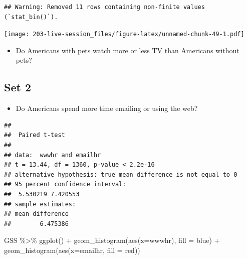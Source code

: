 \documentclass[
]{book}
\newenvironment{Shaded}{\begin{snugshade}}{\end{snugshade}}
\newcommand{\AttributeTok}[1]{\textcolor[rgb]{0.77,0.63,0.00}{#1}}
\newcommand{\ConstantTok}[1]{\textcolor[rgb]{0.00,0.00,0.00}{#1}}
\newcommand{\FunctionTok}[1]{\textcolor[rgb]{0.00,0.00,0.00}{#1}}
\newcommand{\NormalTok}[1]{#1}
\newcommand{\SpecialCharTok}[1]{\textcolor[rgb]{0.00,0.00,0.00}{#1}}
\newcommand{\StringTok}[1]{\textcolor[rgb]{0.31,0.60,0.02}{#1}}
\providecommand{\tightlist}{%
  \setlength{\itemsep}{0pt}\setlength{\parskip}{0pt}}
\theoremstyle{definition}
\theoremstyle{definition}
\theoremstyle{definition}
\theoremstyle{definition}
\theoremstyle{remark}
\begin{document}
\begin{verbatim}
## Warning: Removed 11 rows containing non-finite values (`stat_bin()`).
\end{verbatim}

\texttt{[image: 203-live-session\_files/figure-latex/unnamed-chunk-49-1.pdf]}

\begin{itemize}
\tightlist
\item
  Do Americans with pets watch more or less TV than Americans without pets?
\end{itemize}

\hypertarget{set-2}{%
\subsection{Set 2}\label{set-2}}

\begin{itemize}
\tightlist
\item
  Do Americans spend more time emailing or using the web?
\end{itemize}

\begin{Shaded}
\end{Shaded}

\begin{verbatim}
## 
##  Paired t-test
## 
## data:  wwwhr and emailhr
## t = 13.44, df = 1360, p-value < 2.2e-16
## alternative hypothesis: true mean difference is not equal to 0
## 95 percent confidence interval:
##  5.530219 7.420553
## sample estimates:
## mean difference 
##        6.475386
\end{verbatim}

\begin{Shaded}
\begin{Highlighting}[]
\NormalTok{GSS }\SpecialCharTok{\%\textgreater{}\%} 
  \FunctionTok{ggplot}\NormalTok{() }\SpecialCharTok{+} 
  \FunctionTok{geom\_histogram}\NormalTok{(}\FunctionTok{aes}\NormalTok{(}\AttributeTok{x=}\NormalTok{wwwhr), }\AttributeTok{fill =} \StringTok{\textquotesingle{}blue\textquotesingle{}}\NormalTok{) }\SpecialCharTok{+} 
  \FunctionTok{geom\_histogram}\NormalTok{(}\FunctionTok{aes}\NormalTok{(}\AttributeTok{x=}\NormalTok{emailhr, }\AttributeTok{fill =} \StringTok{\textquotesingle{}red\textquotesingle{}}\NormalTok{))}
\end{Highlighting}
\end{Shaded}
\end{document}
